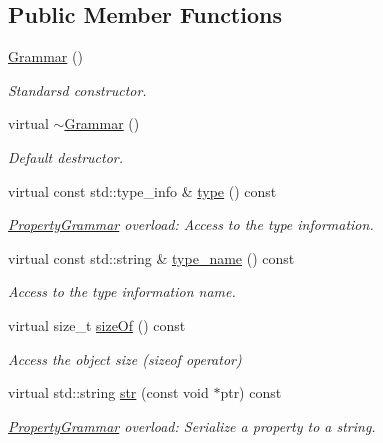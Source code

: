 \subsection*{Public Member Functions}
\begin{DoxyCompactItemize}
\item 
\hyperlink{class_d_d4hep_1_1_grammar_a38672ae640c8b5a7e36af4084878f74a}{Grammar} ()
\begin{DoxyCompactList}\small\item\em Standarsd constructor. \end{DoxyCompactList}\item 
virtual \hyperlink{class_d_d4hep_1_1_grammar_a53982c366a911db255f51de19d9ce9ef}{$\sim$\+Grammar} ()
\begin{DoxyCompactList}\small\item\em Default destructor. \end{DoxyCompactList}\item 
virtual const std\+::type\+\_\+info \& \hyperlink{class_d_d4hep_1_1_grammar_aff59cecd068a31460b5323552fd711ce}{type} () const
\begin{DoxyCompactList}\small\item\em \hyperlink{class_d_d4hep_1_1_property_grammar}{Property\+Grammar} overload\+: Access to the type information. \end{DoxyCompactList}\item 
virtual const std\+::string \& \hyperlink{class_d_d4hep_1_1_grammar_a26bd74714c2c52cd9102bea266607c75}{type\+\_\+name} () const
\begin{DoxyCompactList}\small\item\em Access to the type information name. \end{DoxyCompactList}\item 
virtual size\+\_\+t \hyperlink{class_d_d4hep_1_1_grammar_a12daedd346b5eec5a95c0081918d7e0b}{size\+Of} () const
\begin{DoxyCompactList}\small\item\em Access the object size (sizeof operator) \end{DoxyCompactList}\item 
virtual std\+::string \hyperlink{class_d_d4hep_1_1_grammar_a405a9e6504ed0c6dc5a774cf4839447c}{str} (const void $\ast$ptr) const
\begin{DoxyCompactList}\small\item\em \hyperlink{class_d_d4hep_1_1_property_grammar}{Property\+Grammar} overload\+: Serialize a property to a string. \end{DoxyCompactList}\item 

\end{DoxyCompactItemize}

